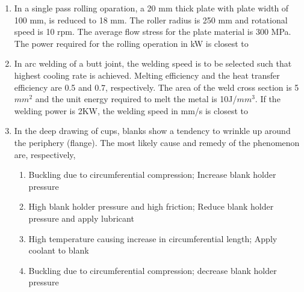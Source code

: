 \documentclass[journal]{IEEEtran}
\numberwithin{equation}{enumi}
\numberwithin{figure}{enumi}
\begin{document}
\begin{enumerate}
\begin{enumerate}
\end{enumerate}
\item In a single pass rolling oparation, a 20 mm thick plate with plate width of 100 mm, is reduced to 18 mm. The roller radius is 250 mm and rotational speed is 10 rpm. The average flow stress for the plate material is 300 MPa. The power required for the rolling  operation in kW is closest to 
\begin{enumerate}
    

  
\end{enumerate}

\item In arc welding of a butt joint, the welding speed is to be selected such that highest cooling rate is achieved. Melting efficiency and the heat transfer efficiency are 0.5 and 0.7, respectively. The area of the weld cross section is 5 $mm^2$ and the unit energy required to melt the metal is 10J/$mm^3$. If the welding power is 2KW, the welding speed in mm/s is closest to 
\begin{enumerate}

\end{enumerate}
\item In the deep drawing of cups, blanks show a tendency to wrinkle up around the periphery (flange). The most likely cause and remedy of the phenomenon are, respectively,

\begin{enumerate}
    \item Buckling due to circumferential compression; Increase blank holder pressure
    \item High blank holder pressure and high friction; Reduce blank holder pressure and apply lubricant
    \item High temperature causing increase in circumferential length; Apply coolant to blank
    \item Buckling due to circumferential compression; decrease blank holder pressure
\end{enumerate}

\end{enumerate}
\end{document}
